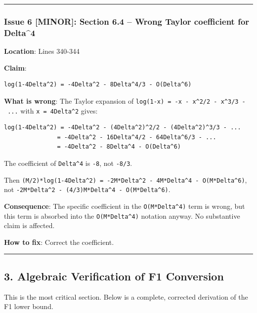 \documentclass[
  12pt,
]{ctexart}
\begin{document}
\begin{center}\rule{0.5\linewidth}{0.5pt}\end{center}

\subsubsection{Issue 6 {[}MINOR{]}: Section 6.4 -- Wrong Taylor
coefficient for
Delta\^{}4}\label{issue-6-minor-section-6.4-wrong-taylor-coefficient-for-delta4}

\textbf{Location}: Lines 340-344

\textbf{Claim}:

\begin{verbatim}
log(1-4Delta^2) = -4Delta^2 - 8Delta^4/3 - O(Delta^6)
\end{verbatim}

\textbf{What is wrong}: The Taylor expansion of
\texttt{log(1-x)\ =\ -x\ -\ x\^{}2/2\ -\ x\^{}3/3\ -\ ...} with
\texttt{x\ =\ 4Delta\^{}2} gives:

\begin{verbatim}
log(1-4Delta^2) = -4Delta^2 - (4Delta^2)^2/2 - (4Delta^2)^3/3 - ...
               = -4Delta^2 - 16Delta^4/2 - 64Delta^6/3 - ...
               = -4Delta^2 - 8Delta^4 - O(Delta^6)
\end{verbatim}

The coefficient of \texttt{Delta\^{}4} is \texttt{-8}, not
\texttt{-8/3}.

Then
\texttt{(M/2)*log(1-4Delta\^{}2)\ =\ -2M*Delta\^{}2\ -\ 4M*Delta\^{}4\ -\ O(M*Delta\^{}6)},
not \texttt{-2M*Delta\^{}2\ -\ (4/3)M*Delta\^{}4\ -\ O(M*Delta\^{}6)}.

\textbf{Consequence}: The specific coefficient in the
\texttt{O(M*Delta\^{}4)} term is wrong, but this term is absorbed into
the \texttt{O(M*Delta\^{}4)} notation anyway. No substantive claim is
affected.

\textbf{How to fix}: Correct the coefficient.

\begin{center}\rule{0.5\linewidth}{0.5pt}\end{center}

\subsection{3. Algebraic Verification of F1
Conversion}\label{algebraic-verification-of-f1-conversion}

This is the most critical section. Below is a complete, corrected
derivation of the F1 lower bound.
\end{document}
